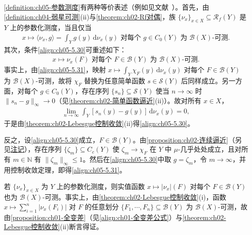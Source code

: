 \documentclass[../../main.tex]{subfiles}%
\begin{document}
\begin{remark}\label{remark:ch05-参数测度等价}
\cref{definition:ch05-参数测度}有两种等价表述（例如见文献~\cite{ref05}）。首先，由\cref{definition:ch04-弱星可测}(ii)与\cref{theorem:ch02-Rf对偶}，族 $\{\nu_x\}_{x\in X}\subseteq\mathscr{R}_f(Y)$ 是 $Y$ 上的参数化测度，当且仅当
\begin{align}
x\mapsto\langle\nu_x,g\rangle=\int_Y g(y)\,\mathrm{d}\nu_x(y)
\text{ 对每个 }g\in C_0(Y)\text{ 为 }\mathscr{B}(X)\text{-可测}.\label{align:ch05-5.30}
\end{align}
其次，条件\eqref{align:ch05-5.30}可重述如下：
\begin{align}
x\mapsto\nu_x(F)\text{ 对每个 }F\in\mathscr{B}(Y)\text{ 为 }\mathscr{B}(X)\text{-可测}.\label{align:ch05-5.31}
\end{align}
事实上，由\eqref{align:ch05-5.31}，映射 $x\mapsto\int_Y\chi_F(y)\,\mathrm{d}\nu_x(y)$ 对每个 $F\in\mathscr{B}(Y)$ 为 $\mathscr{B}(X)$-可测，故将 $\chi_F$ 替换为任意简单函数 $s\in\mathcal{S}(Y)$ 后同样成立。另一方面，对每个 $g\in C_0(Y)$，存在序列 $\{s_n\}\subseteq\mathcal{S}(Y)$ 使当 $n\to\infty$ 时 $\|s_n-g\|_\infty\to0$（见\cref{theorem:ch02-简单函数逼近}(ii)）。故对所有 $x\in X$，
\begin{align*}
\lim_{n\to\infty}\int_Y[s_n(y)-g(y)]\,\mathrm{d}\nu_x(y)=0,
\end{align*}
于是由\cref{theorem:ch02-Lebesgue控制收敛}(ii)得\eqref{align:ch05-5.30}。

反之，设\eqref{align:ch05-5.30}成立，$F\in\mathscr{B}(Y)$。由\cref{proposition:ch02-连续逼近}（另见\hyperref[remark:ch02-连续逼近注]{注记}），存在序列 $\{\zeta_m\}\subseteq C_c(Y)$ 使 $\zeta_m\to\chi_F$ 在 $Y$ 中 $\mu$-几乎处处成立，且对所有 $m\in\mathbb{N}$ 有 $\|\zeta_m\|_\infty\leqslant1$。然后在\eqref{align:ch05-5.30}中取 $g=\zeta_m$，令 $m\to\infty$，并用控制收敛定理，即得\eqref{align:ch05-5.31}。
\end{remark}

\begin{remark}\label{remark:ch05-变差可测}
若 $\{\nu_x\}_{x\in X}$ 为 $Y$ 上的参数化测度，则实值函数 $x\mapsto|\nu_x|(F)$ 对每个 $F\in\mathscr{B}(Y)$ 也为 $\mathscr{B}(X)$-可测。事实上，由\cref{theorem:ch02-Lebesgue控制收敛}(i)，函数 $x\mapsto\sum_{i=1}^n|\nu_x(F_i)|$ 对 $F$ 的任意划分 $\{F_1,\cdots ,F_n\}\subseteq\mathscr{B}(Y)$ 为 $\mathscr{B}(X)$-可测，故由\cref{proposition:ch01-全变差}（见\eqref{align:ch01-全变差公式}）与\cref{theorem:ch02-Lebesgue控制收敛}(ii)断言得证。
\end{remark}
\end{document}
